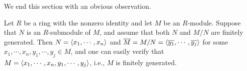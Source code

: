 We end this section with an obvious observation.
\begin{exmp}
    Let $R$ be a ring with the nonzero identity and let $M$ be an $R$-module.
    Suppose that $N$ is an $R$-submodule of $M$, and assume that both $N$ and $M/N$ are finitely generated.
    Then $N={\left\langle{x_1, \cdots, x_n}\right\rangle}$ and $\overline{M}=M/N={\left\langle{\overline{y_1}, \cdots, \overline{y_j}}\right\rangle}$ for some $x_1, \cdots, x_n, y_1, \cdots, y_j\in M$, and one can easily verify that $M={\left\langle{x_1, \cdots, x_n, y_1, \cdots, y_j}\right\rangle}$, i.e., $M$ is finitely generated.
\end{exmp}